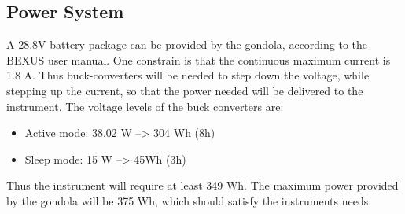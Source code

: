 \pagebreak
\subsection{Power System}

\label{sec:4.7}

A 28.8V battery package can be provided by the gondola, according to the BEXUS user manual. One constrain is that the continuous maximum current is 1.8 A. Thus buck-converters will be needed to step down the voltage, while stepping up the current, so that the power needed will be delivered to the instrument. The voltage levels of the buck converters are: 







\begin{itemize}
    \item Active mode: 38.02 W  --> 304 Wh (8h)
    \item Sleep mode: 15 W --> 45Wh (3h) 
\end{itemize}

Thus the instrument will require at least 349 Wh. The maximum power provided by the gondola will be 375 Wh, which should satisfy the instruments needs.




\raggedbottom
